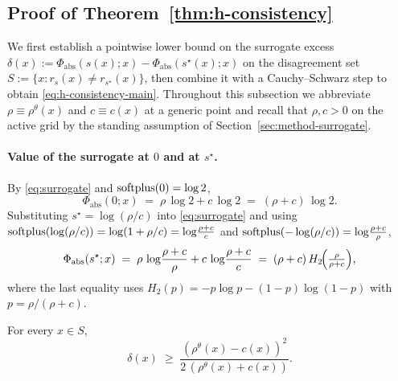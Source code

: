 \subsection{Proof of Theorem~\ref{thm:h-consistency}}
\label{app:hconsistency}

We first establish a pointwise lower bound on the surrogate excess
$\delta(x):=\Phi_{\mathrm{abs}}(s(x);x)-\Phi_{\mathrm{abs}}(s^\star(x);x)$
on the disagreement set $S:=\{x:r_s(x)\neq r_{s^\star}(x)\}$, then
combine it with a Cauchy--Schwarz step to obtain
\eqref{eq:h-consistency-main}. Throughout this subsection we abbreviate
$\rho\equiv\rho^\theta(x)$ and $c\equiv c(x)$ at a generic point and
recall that $\rho,c>0$ on the active grid by the standing assumption of
Section~\ref{sec:method-surrogate}.

\paragraph{Value of the surrogate at $0$ and at $s^\star$.}
By \eqref{eq:surrogate} and $\operatorname{softplus}(0)=\log 2$,
\begin{equation}
  \Phi_{\mathrm{abs}}(0;x)\;=\;\rho\,\log 2+c\,\log 2\;=\;(\rho+c)\,\log 2.
  \label{eq:phi-zero}
\end{equation}
Substituting $s^\star=\log(\rho/c)$ into \eqref{eq:surrogate} and using
$\operatorname{softplus}(\log(\rho/c))=\log(1+\rho/c)=\log\!\frac{\rho+c}{c}$ and
$\operatorname{softplus}(-\log(\rho/c))=\log\!\frac{\rho+c}{\rho}$,
\begin{equation}
  \Phi_{\mathrm{abs}}(s^\star;x)
  \;=\;\rho\,\log\!\frac{\rho+c}{\rho}+c\,\log\!\frac{\rho+c}{c}
  \;=\;(\rho+c)\,H_2\!\Bigl(\tfrac{\rho}{\rho+c}\Bigr),
  \label{eq:phi-star}
\end{equation}
where the last equality uses
$H_2(p)=-p\log p-(1-p)\log(1-p)$ with $p=\rho/(\rho+c)$.

\begin{lemma}
\label{lem:gap}
For every $x\in S$,
\begin{equation}
  \delta(x)\;\geq\;\frac{(\rho^\theta(x)-c(x))^2}{2\,(\rho^\theta(x)+c(x))}.
  \label{eq:gap-bound}
\end{equation}
\end{lemma}

